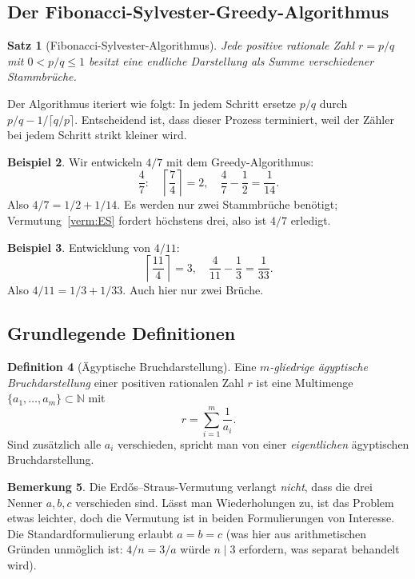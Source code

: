 \documentclass[12pt,a4paper]{amsart}
\newtheorem{theorem}{Satz}[section]
\theoremstyle{definition}
\newtheorem{definition}[theorem]{Definition}
\newtheorem{example}[theorem]{Beispiel}
\newtheorem{remark}[theorem]{Bemerkung}
\newcommand{\N}{\mathbb{N}}
\begin{document}
\subsection{Der Fibonacci-Sylvester-Greedy-Algorithmus}

\begin{theorem}[Fibonacci-Sylvester-Algorithmus]\label{satz:sylvester}
Jede positive rationale Zahl $r = p/q$ mit $0 < p/q \leq 1$ besitzt
eine endliche Darstellung als Summe verschiedener Stammbrüche.
\end{theorem}

Der Algorithmus iteriert wie folgt: In jedem Schritt ersetze $p/q$ durch
$p/q - 1/\lceil q/p \rceil$.  Entscheidend ist, dass dieser Prozess
terminiert, weil der Zähler bei jedem Schritt strikt kleiner wird.

\begin{example}
Wir entwickeln $4/7$ mit dem Greedy-Algorithmus:
\[
  \frac{4}{7}: \quad \left\lceil \frac{7}{4} \right\rceil = 2,
  \quad \frac{4}{7} - \frac{1}{2} = \frac{1}{14}.
\]
Also $4/7 = 1/2 + 1/14$.  Es werden nur zwei Stammbrüche benötigt;
Vermutung~\ref{verm:ES} fordert höchstens drei, also ist $4/7$ erledigt.
\end{example}

\begin{example}
Entwicklung von $4/11$:
\[
  \left\lceil \frac{11}{4} \right\rceil = 3,\quad
  \frac{4}{11} - \frac{1}{3} = \frac{1}{33}.
\]
Also $4/11 = 1/3 + 1/33$.  Auch hier nur zwei Brüche.
\end{example}

\subsection{Grundlegende Definitionen}

\begin{definition}[Ägyptische Bruchdarstellung]
Eine \emph{$m$-gliedrige ägyptische Bruchdarstellung} einer positiven
rationalen Zahl $r$ ist eine Multimenge $\{a_1, \ldots, a_m\} \subset \N$ mit
\[
  r = \sum_{i=1}^{m} \frac{1}{a_i}.
\]
Sind zusätzlich alle $a_i$ verschieden, spricht man von einer
\emph{eigentlichen} ägyptischen Bruchdarstellung.
\end{definition}

\begin{remark}
Die Erd\H{o}s--Straus-Vermutung verlangt \emph{nicht}, dass die drei
Nenner $a, b, c$ verschieden sind.  Lässt man Wiederholungen zu,
ist das Problem etwas leichter, doch die Vermutung ist in beiden
Formulierungen von Interesse.  Die Standardformulierung erlaubt $a = b = c$
(was hier aus arithmetischen Gründen unmöglich ist: $4/n = 3/a$ würde
$n \mid 3$ erfordern, was separat behandelt wird).
\end{remark}
\end{document}
